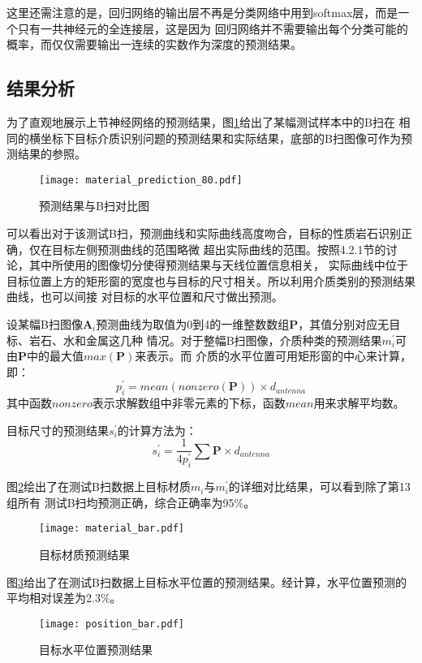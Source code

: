 这里还需注意的是，回归网络的输出层不再是分类网络中用到softmax层，而是一个只有一共神经元的全连接层，这是因为
回归网络并不需要输出每个分类可能的概率，而仅仅需要输出一连续的实数作为深度的预测结果。
\subsection{结果分析}
为了直观地展示上节神经网络的预测结果，图\ref{material_prediction}给出了某幅测试样本中的B扫在
相同的横坐标下目标介质识别问题的预测结果和实际结果，底部的B扫图像可作为预测结果的参照。
\begin{figure}[htbp]
	\texttt{[image: material\_prediction\_80.pdf]}
	\caption[]{预测结果与B扫对比图}
	\label{material_prediction}
\end{figure}

可以看出对于该测试B扫，预测曲线和实际曲线高度吻合，目标的性质岩石识别正确，仅在目标左侧预测曲线的范围略微
超出实际曲线的范围。按照4.2.1节的讨论，其中所使用的图像切分使得预测结果与天线位置信息相关，
实际曲线中位于目标位置上方的矩形窗的宽度也与目标的尺寸相关。所以利用介质类别的预测结果曲线，也可以间接
对目标的水平位置和尺寸做出预测。

设某幅B扫图像$\mathbf{A}_i$预测曲线为取值为0到4的一维整数数组$\mathbf{P}$，其值分别对应无目标、岩石、水和金属这几种
情况。对于整幅B扫图像，介质种类的预测结果$m_i^{\prime}$可由$\mathbf{P}$中的最大值$max(\mathbf{P})$来表示。而
介质的水平位置可用矩形窗的中心来计算，即：
\begin{equation}
	p_i^{\prime} = mean(nonzero(\mathbf{P}))\times d_{antenna}
\end{equation}
其中函数$nonzero$表示求解数组中非零元素的下标，函数$mean$用来求解平均数。

目标尺寸的预测结果$s_i^{\prime}$的计算方法为：
\begin{equation}
	s_i^{\prime} = \frac{1}{4 p_i^{\prime}}\sum{\mathbf{P}}\times d_{antenna}
\end{equation}

图\ref{material_bar}绘出了在测试B扫数据上目标材质$m_i$与$m_i^{\prime}$的详细对比结果，可以看到除了第13组所有
测试B扫均预测正确，综合正确率为95\%。
\begin{figure}[htbp]
	\texttt{[image: material\_bar.pdf]}
	\caption[]{目标材质预测结果}
	\label{material_bar}
\end{figure}

图\ref{position_bar}给出了在测试B扫数据上目标水平位置的预测结果。经计算，水平位置预测的平均相对误差为2.3\%。
\begin{figure}[htbp]		
	\texttt{[image: position\_bar.pdf]}
	\caption[]{目标水平位置预测结果}
	\label{position_bar}
\end{figure}

